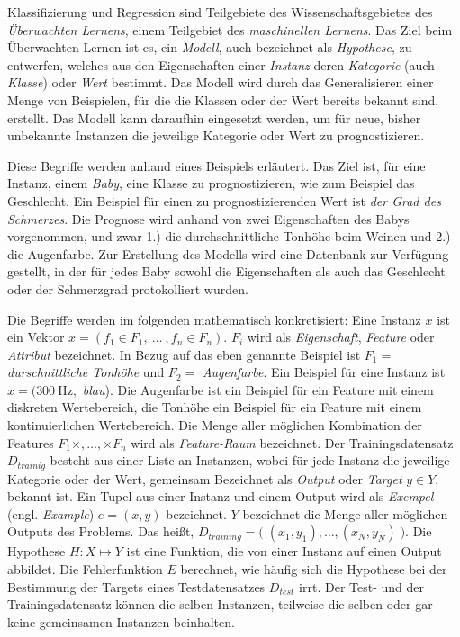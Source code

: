 Klassifizierung und Regression sind Teilgebiete des Wissenschaftsgebietes des \emph{Überwachten Lernens}, einem Teilgebiet des \emph{maschinellen Lernens}. Das Ziel beim Überwachten Lernen ist es, ein \emph{Modell}, auch bezeichnet als \emph{Hypothese}, zu entwerfen, welches aus den Eigenschaften einer \emph{Instanz} deren \emph{Kategorie} (auch \emph{Klasse}) oder \emph{Wert} bestimmt. Das Modell wird durch das Generalisieren einer Menge von Beispielen, für die die Klassen oder der Wert bereits bekannt sind, erstellt. Das Modell kann daraufhin eingesetzt werden, um für neue, bisher unbekannte Instanzen die jeweilige Kategorie oder Wert zu prognostizieren.\cite[S. 6 - 7]{machine_marsland}

Diese Begriffe werden anhand eines Beispiels erläutert. Das Ziel ist, für eine Instanz, einem \emph{Baby}, eine Klasse zu prognostizieren, wie zum Beispiel das Geschlecht. Ein Beispiel für einen zu prognostizierenden Wert ist \emph{der Grad des Schmerzes}. Die Prognose wird anhand von zwei Eigenschaften des Babys vorgenommen, und zwar 1.) die durchschnittliche Tonhöhe beim Weinen und 2.) die Augenfarbe. Zur Erstellung des Modells wird eine Datenbank zur Verfügung gestellt, in der für jedes Baby sowohl die Eigenschaften als auch das Geschlecht oder der Schmerzgrad protokolliert wurden.

Die Begriffe werden im folgenden mathematisch konkretisiert: Eine Instanz $x$ ist ein Vektor $x = ( f_1 \in F_1 ,\ \ldots\ , f_n \in F_n )$. $F_i$ wird als \emph{Eigenschaft}, \emph{Feature} oder \emph{Attribut} bezeichnet. In Bezug auf das eben genannte Beispiel ist $F_1 = $ \emph{durschnittliche Tonhöhe} und $F_2 = $ \emph{Augenfarbe}. Ein Beispiel für eine Instanz ist $x = ( \SI{300}{\hertz},$ \emph{blau}). Die Augenfarbe ist ein Beispiel für ein Feature mit einem diskreten Wertebereich, die Tonhöhe ein Beispiel für ein Feature mit einem kontinuierlichen Wertebereich. Die Menge aller möglichen Kombination der Features $F_1 \times , \ldots , \times F_n$ wird als \emph{Feature-Raum} bezeichnet. Der Trainingsdatensatz $D_{trainig}$ besteht aus einer Liste an Instanzen, wobei für jede Instanz die jeweilige Kategorie oder der Wert, gemeinsam Bezeichnet als \emph{Output} oder \emph{Target} $y \in Y$, bekannt ist. Ein Tupel aus einer Instanz und einem Output wird als \emph{Exempel} (engl. \emph{Example}) $e =(x,y)$ bezeichnet. $Y$ bezeichnet die Menge aller möglichen Outputs des Problems. Das heißt, $D_{training} = \big( \; (x_1, y_1), \ldots , (x_N, y_N) \; \big)$. Die Hypothese $H: X \mapsto Y$ ist eine Funktion, die von einer Instanz auf einen Output abbildet. Die Fehlerfunktion $E$ berechnet, wie häufig sich die Hypothese bei der Bestimmung der Targets eines Testdatensatzes $D_{test}$ irrt. Der Test- und der Trainingsdatensatz können die selben Instanzen, teilweise die selben oder gar keine gemeinsamen Instanzen beinhalten.\cite[S. 6 - 7, 18 - 19]{machine_marsland} \cite[S. 8 - 9]{learning_cart_dobra} 

